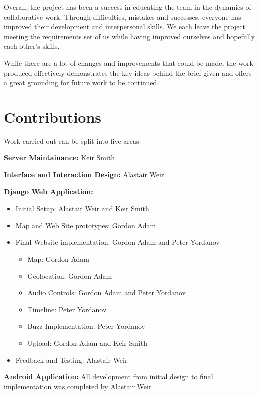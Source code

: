 \documentclass{l3proj}
\begin{document}
Overall, the project has been a success in educating the team in the dynamics of collaborative work. Through difficulties, mistakes and successes, everyone has improved their development and interpersonal skills. We each leave the project meeting the requirements set of us while having improved ourselves and hopefully each other's skills.

While there are a lot of changes and improvements that could be made, the work produced effectively demonstrates the key ideas behind the brief given and offers a great grounding for future work to be continued.

\section{Contributions}

Work carried out can be split into five areas:

\textbf{Server Maintainance:} Keir Smith

\textbf{Interface and Interaction Design:} Alastair Weir

\textbf{Django Web Application:}
\begin{itemize}
	\item{Initial Setup: Alastair Weir and Keir Smith}
	\item{Map and Web Site prototypes: Gordon Adam}
	\item{Final Website implementation: Gordon Adam and Peter Yordanov}
	\begin{itemize}
		\item{Map: Gordon Adam}
		\item{Geolocation: Gordon Adam}
		\item{Audio Controls: Gordon Adam and Peter Yordanov}
		\item{Timeline: Peter Yordanov}
		\item{Buzz Implementation: Peter Yordanov}
		\item{Upload: Gordon Adam and Keir Smith}
	\end{itemize}
	\item{Feedback and Testing: Alastair Weir}
\end{itemize}

\textbf{Android Application:} All development from initial design to final implementation was completed by Alastair Weir
\end{document}
